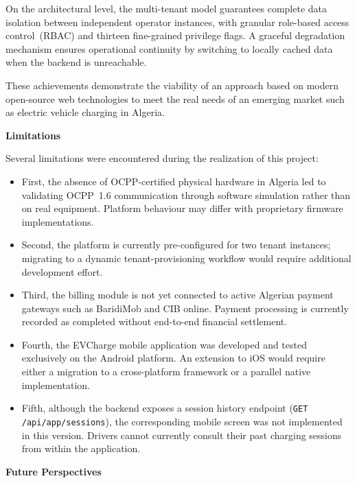 \documentclass[12pt,a4paper]{report}
\begin{document}
On the architectural level, the multi-tenant model guarantees complete data isolation between
independent operator instances, with granular role-based access control~(RBAC) and thirteen
fine-grained privilege flags. A graceful degradation mechanism ensures operational continuity
by switching to locally cached data when the backend is unreachable.

These achievements demonstrate the viability of an approach based on modern open-source web
technologies to meet the real needs of an emerging market such as electric vehicle charging
in Algeria.

\medskip
\noindent\textbf{Limitations}

Several limitations were encountered during the realization of this project:

\begin{itemize}
  \item First, the absence of OCPP-certified physical hardware in Algeria led to validating
        OCPP~1.6 communication through software simulation rather than on real equipment.
        Platform behaviour may differ with proprietary firmware implementations.

  \item Second, the platform is currently pre-configured for two tenant instances; migrating
        to a dynamic tenant-provisioning workflow would require additional development effort.

  \item Third, the billing module is not yet connected to active Algerian payment gateways
        such as BaridiMob and CIB online. Payment processing is currently recorded as
        completed without end-to-end financial settlement.

  \item Fourth, the EVCharge mobile application was developed and tested exclusively on
        the Android platform. An extension to iOS would require either a migration to a
        cross-platform framework or a parallel native implementation.

  \item Fifth, although the backend exposes a session history endpoint
        (\texttt{GET /api/app/sessions}), the corresponding mobile screen was not implemented
        in this version. Drivers cannot currently consult their past charging sessions from
        within the application.
\end{itemize}

\medskip
\noindent\textbf{Future Perspectives}
\end{document}
